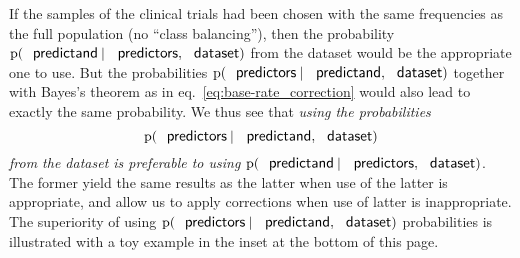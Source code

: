 \documentclass[utf8]{FrontiersinHarvard} %
\newcommand*{\eqn}{eq.}%
\newcommand*{\p}{\mathrm{p}}%
\renewcommand*{\|}[1][]{\nonscript\:#1\vert\nonscript\:\mathopen{}}
\begin{document}
If the samples of the clinical trials had been chosen with the same frequencies as the full population (no \enquote{class balancing}), then the probability $\p(\textsf{\small predictand} \| \textsf{\small predictors}, \textsf{\small dataset})$ from the dataset would be the appropriate one to use. But the probabilities $\p(\textsf{\small predictors} \| \textsf{\small predictand}, \textsf{\small dataset})$ together with Bayes's theorem as in \eqn~\eqref{eq:base-rate_correction} would also lead to exactly the same probability. We thus see that \emph{using the probabilities}
\[\p(\textsf{\small predictors} \| \textsf{\small predictand}, \textsf{\small dataset})\]
\emph{from the dataset is preferable to using} $\p(\textsf{\small predictand} \| \textsf{\small predictors}, \textsf{\small dataset})$. The former yield the same results as the latter when use of the latter is appropriate, and allow us to apply corrections when use of latter is inappropriate. The superiority of using $\p(\textsf{\small predictors} \| \textsf{\small predictand}, \textsf{\small dataset})$ probabilities is illustrated with a toy example in the inset at the bottom of this page.
\end{document}
